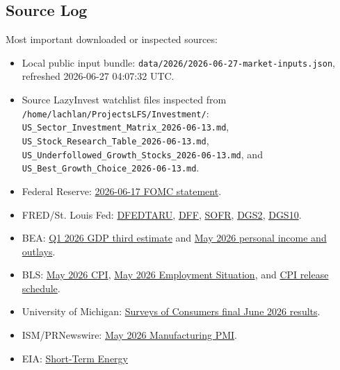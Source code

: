 \documentclass[
  9pt,
]{article}
\providecommand{\tightlist}{%
  \setlength{\itemsep}{0pt}\setlength{\parskip}{0pt}}
\begin{document}
\hypertarget{source-log}{%
\subsection{Source Log}\label{source-log}}

Most important downloaded or inspected sources:

\begin{itemize}
\tightlist
\item
  Local public input bundle:
  \texttt{data/2026/2026-06-27-market-inputs.json}, refreshed
  2026-06-27 04:07:32 UTC.
\item
  Source LazyInvest watchlist files inspected from
  \texttt{/home/lachlan/ProjectsLFS/Investment/}:
  \texttt{US\_Sector\_Investment\_Matrix\_2026-06-13.md},
  \texttt{US\_Stock\_Research\_Table\_2026-06-13.md},
  \texttt{US\_Underfollowed\_Growth\_Stocks\_2026-06-13.md}, and
  \texttt{US\_Best\_Growth\_Choice\_2026-06-13.md}.
\item
  Federal Reserve:
  \href{https://www.federalreserve.gov/newsevents/pressreleases/monetary20260617a.htm}{2026-06-17
  FOMC statement}.
\item
  FRED/St. Louis Fed:
  \href{https://fred.stlouisfed.org/series/DFEDTARU}{DFEDTARU},
  \href{https://fred.stlouisfed.org/series/DFF}{DFF},
  \href{https://fred.stlouisfed.org/series/SOFR}{SOFR},
  \href{https://fred.stlouisfed.org/series/DGS2}{DGS2},
  \href{https://fred.stlouisfed.org/series/DGS10}{DGS10}.
\item
  BEA:
  \href{https://www.bea.gov/news/2026/gdp-third-estimate-industries-corporate-profits-state-gdp-and-state-personal-income-1st}{Q1
  2026 GDP third estimate} and
  \href{https://www.bea.gov/news/2026/personal-income-and-outlays-may-2026}{May
  2026 personal income and outlays}.
\item
  BLS: \href{https://www.bls.gov/news.release/cpi.nr0.htm}{May 2026
  CPI}, \href{https://www.bls.gov/news.release/empsit.nr0.htm}{May 2026
  Employment Situation}, and
  \href{https://www.bls.gov/schedule/news_release/cpi.htm}{CPI release
  schedule}.
\item
  University of Michigan: \href{https://www.sca.isr.umich.edu/}{Surveys
  of Consumers final June 2026 results}.
\item
  ISM/PRNewswire:
  \href{https://www.prnewswire.com/news-releases/manufacturing-pmi-at-54-may-2026-ism-manufacturing-pmi-report-302786165.html}{May
  2026 Manufacturing PMI}.
\item
  EIA: \href{https://www.eia.gov/outlooks/steo/}{Short-Term Energy
}
\end{itemize}
\end{document}
